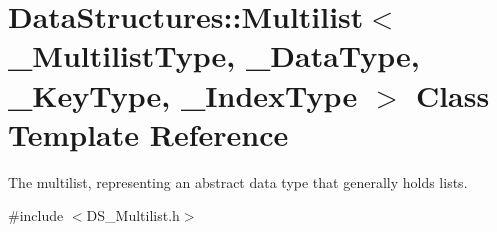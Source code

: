 \hypertarget{class_data_structures_1_1_multilist}{\section{Data\-Structures\-:\-:Multilist$<$ \-\_\-\-Multilist\-Type, \-\_\-\-Data\-Type, \-\_\-\-Key\-Type, \-\_\-\-Index\-Type $>$ Class Template Reference}
\label{class_data_structures_1_1_multilist}
}


The multilist, representing an abstract data type that generally holds lists.  




{\ttfamily \#include $<$D\-S\-\_\-\-Multilist.\-h$>$}

